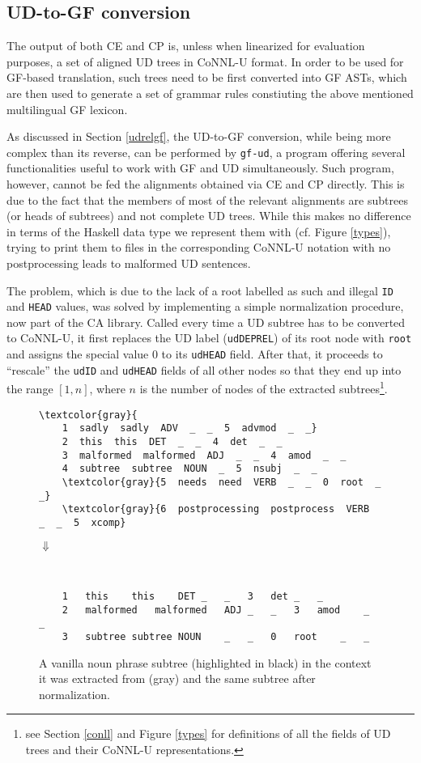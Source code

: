 \subsection{UD-to-GF conversion}
The output of both CE and CP is, unless when linearized for evaluation purposes, a set of aligned UD trees in CoNNL-U format. In order to be used for GF-based translation, such trees need to be first converted into GF ASTs, which are then used to generate a set of grammar rules constiuting the above mentioned multilingual GF lexicon. \smallskip

As discussed in Section \ref{udrelgf}, the UD-to-GF conversion, while being more complex than its reverse, can be performed by \texttt{gf-ud}, a program offering several functionalities useful to work with GF and UD simultaneously.
Such program, however, cannot be fed the alignments obtained via CE and CP directly. This is due to the fact that the members of most of the relevant alignments are subtrees (or heads of subtrees) and not complete UD trees. 
While this makes no difference in terms of the Haskell data type we represent them with (cf. Figure \ref{types}), trying to print them to files in the corresponding CoNNL-U notation with no postprocessing leads to malformed UD sentences. \smallskip

The problem, which is due to the lack of a root labelled as such and illegal \texttt{ID} and \texttt{HEAD} values, was solved by implementing a simple normalization procedure, now part of the CA library. 
Called every time a UD subtree has to be converted to CoNNL-U, it first replaces the UD label (\texttt{udDEPREL}) of its root node with \texttt{root} and assigns the special value 0 to its \texttt{udHEAD} field. After that, it proceeds to ``rescale'' the \texttt{udID} and \texttt{udHEAD} fields of all other nodes so that they end up into the range $[1,n]$, where $n$ is the number of nodes of the extracted subtrees\footnote{see Section \ref{conll} and Figure \ref{types} for definitions of all the fields of UD trees and their CoNNL-U representations.}. \smallskip

\begin{figure}[H]
\small
\begin{Verbatim}[commandchars=\\\{\}]
\textcolor{gray}{   
    1  sadly  sadly  ADV  _  _  5  advmod  _  _}
    2  this  this  DET  _  _  4  det  _  _
    3  malformed  malformed  ADJ  _  _  4  amod  _  _
    4  subtree  subtree  NOUN  _  5  nsubj  _  _
    \textcolor{gray}{5  needs  need  VERB  _  _  0  root  _  _}
    \textcolor{gray}{6  postprocessing  postprocess  VERB  _  _  5  xcomp}

\end{Verbatim}
\centering
\large
$\Downarrow$
\small
\begin{verbatim}


    1	this	this	DET	_	_	3	det	_	_
    2	malformed	malformed	ADJ	_	_	3	amod	_	_
    3	subtree	subtree	NOUN	_	_	0	root	_	_
\end{verbatim}
\caption[A UD subtree and its normalization]{A vanilla noun phrase subtree (highlighted in black) in the context it was extracted from (gray) and the same subtree after normalization.}
\label{normalization}
\end{figure}

